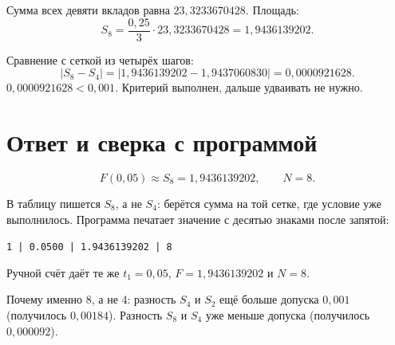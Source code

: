 \documentclass[11pt,a4paper]{article}
\begin{document}
Сумма всех девяти вкладов равна \(23{,}3233670428\). Площадь:
\[
S_{8} = \frac{0{,}25}{3}\cdot 23{,}3233670428 = 1{,}9436139202.
\]

Сравнение с сеткой из четырёх шагов:
\[
|S_{8} - S_{4}| = |1{,}9436139202 - 1{,}9437060830| = 0{,}0000921628.
\]
\(0{,}0000921628 < 0{,}001\). Критерий выполнен, дальше удваивать не нужно.

\section*{Ответ и сверка с программой}

\[
F(0{,}05) \approx S_{8} = 1{,}9436139202, \qquad N = 8.
\]

В таблицу пишется \(S_{8}\), а не \(S_{4}\): берётся сумма на той сетке, где условие уже выполнилось.
Программа печатает значение с десятью знаками после запятой:

\begin{center}
\texttt{1 | 0.0500 | 1.9436139202 | 8}
\end{center}

Ручной счёт даёт те же \(t_{1} = 0{,}05\), \(F = 1{,}9436139202\) и \(N = 8\).

Почему именно 8, а не 4: разность \(S_{4}\) и \(S_{2}\) ещё больше допуска \(0{,}001\)
(получилось \(0{,}00184\)). Разность \(S_{8}\) и \(S_{4}\) уже меньше допуска
(получилось \(0{,}000092\)).
\end{document}
